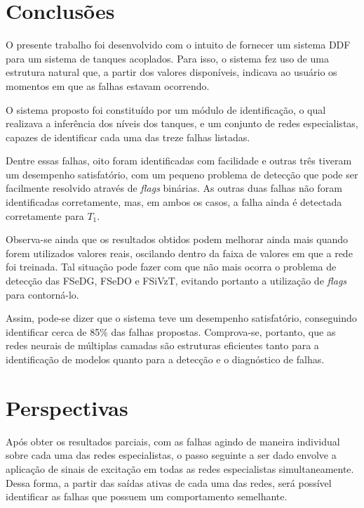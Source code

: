 \label{cap:conclusoes}

\section{Conclusões}

O presente trabalho foi desenvolvido com o intuito de fornecer um sistema DDF
para um sistema de tanques acoplados. Para isso, o sistema fez uso de uma
estrutura natural que, a partir dos valores disponíveis, indicava ao usuário os
momentos em que as falhas estavam ocorrendo.

O sistema proposto foi constituído por um módulo de identificação, o qual
realizava a inferência dos níveis dos tanques, e um conjunto de redes
especialistas, capazes de identificar cada uma das treze falhas listadas.

Dentre essas falhas, oito foram identificadas com facilidade e outras três
tiveram um desempenho satisfatório, com um pequeno problema de detecção que pode
ser facilmente resolvido através de {\it flags} binárias. As outras duas falhas
não foram identificadas corretamente, mas, em ambos os casos, a falha ainda é
detectada corretamente para $T_1$.

Observa-se ainda que os resultados obtidos podem melhorar ainda mais quando
forem utilizados valores reais, oscilando dentro da faixa de valores em que a
rede foi treinada. Tal situação pode fazer com que não mais ocorra o problema de
detecção das FSeDG, FSeDO e FSiVzT, evitando portanto a utilização de {\it
flags} para contorná-lo.

Assim, pode-se dizer que o sistema teve um desempenho satisfatório, conseguindo
identificar cerca de 85\% das falhas propostas. Comprova-se, portanto, que as
redes neurais de múltiplas camadas são estruturas eficientes tanto para a
identificação de modelos quanto para a detecção e o diagnóstico de falhas.

\section{Perspectivas}
Após obter os resultados parciais, com as falhas agindo de maneira individual
sobre cada uma das redes especialistas, o passo seguinte a ser dado envolve a
aplicação de sinais de excitação em todas as redes especialistas
simultaneamente. Dessa forma, a partir das saídas ativas de cada uma das redes,
será possível identificar as falhas que possuem um comportamento semelhante.

